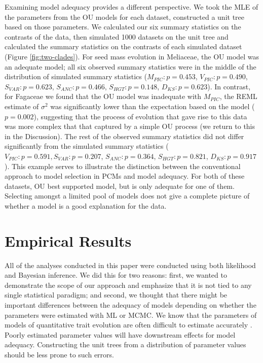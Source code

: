 \documentclass[a4paper,12pt]{article}
\begin{document}
Examining model adequacy provides a different perspective. We took the MLE of the parameters from the OU models for each dataset, constructed a unit tree based on those parameters. We calculated our six summary statistics on the contrasts of the data, then simulated 1000 datasets on the unit tree and calculated the summary statistics on the contrasts of each simulated dataset (Figure \ref{fig:two-clades}). For seed mass evolution in Meliaceae, the OU model was an adequate model; all six observed summary statistics were in the middle of the distribution of simulated summary statistics ($M_{PIC}: p=0.453$, $V_{PIC}: p=0.490$, $S_{VAR}: p=0.623$, $S_{ANC}:p=0.466$, $S_{HGT}: p=0.148$, $D_{KS}: p=0.623$). In contrast, for Fagaceae we found that the OU model was inadequate with $M_{PIC}$, the REML estimate of $\sigma^2$ was significantly lower than the expectation based on the model ($p=0.002$), suggesting that the process of evolution that gave rise to this data was more complex that that captured by a simple OU process (we return to this in the Discussion).  The rest of the observed summary statistics did not differ significantly from the simulated summary statistics ($V_{PIC}:p=0.591, S_{VAR}: p=0.207$, $S_{ANC}:p=0.364$, $S_{HGT}: p=0.821$, $D_{KS}: p=0.917$). This example serves to illustrate the distinction between the conventional approach to model selection in PCMs and model adequacy. For both of these datasets, OU best supported model, but is only adequate for one of them. Selecting amongst a limited pool of models does not give a complete picture of whether a model is a good explanation for the data.


\section{Empirical Results}

All of the analyses conducted in this paper were conducted using both likelihood and Bayesian inference. We did this for two reasons: first, we wanted to demonstrate the scope of our approach and emphasize that it is not tied to any single statistical paradigm; and second, we thought that there might be important differences between the adequacy of models depending on whether the parameters were estimated with ML or MCMC. We know that the parameters of models of quantitative trait evolution are often difficult to estimate accurately \citep{Ane2008, HoAne2012}. Poorly estimated parameter values will have downstream effects for model adequacy. Constructing the unit trees from a distribution of parameter values should be less prone to such errors. 
\end{document}
